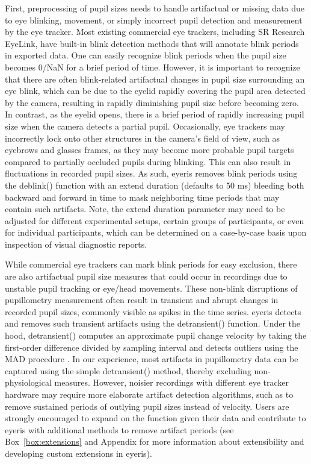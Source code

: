 First, preprocessing of pupil sizes needs to handle artifactual or missing data due to eye blinking, movement, or simply incorrect pupil detection and measurement by the eye tracker. Most existing commercial eye trackers, including SR Research EyeLink, have built-in blink detection methods that will annotate blink periods in exported data. One can easily recognize blink periods when the pupil size becomes 0/NaN for a brief period of time. However, it is important to recognize that there are often blink-related artifactual changes in pupil size surrounding an eye blink, which can be due to the eyelid rapidly covering the pupil area detected by the camera, resulting in rapidly diminishing pupil size before becoming zero. In contrast, as the eyelid opens, there is a brief period of rapidly increasing pupil size when the camera detects a partial pupil. Occasionally, eye trackers may incorrectly lock onto other structures in the camera’s field of view, such as eyebrows and glasses frames, as they may become more probable pupil targets compared to partially occluded pupils during blinking. This can also result in fluctuations in recorded pupil sizes. As such, eyeris removes blink periods using the deblink() function with an extend duration (defaults to 50 ms) bleeding both backward and forward in time to mask neighboring time periods that may contain such artifacts. Note, the extend duration parameter may need to be adjusted for different experimental setups, certain groups of participants, or even for individual participants, which can be determined on a case-by-case basis upon inspection of visual diagnostic reports.

While commercial eye trackers can mark blink periods for easy exclusion, there are also artifactual pupil size measures that could occur in recordings due to unstable pupil tracking or eye/head movements. These non-blink disruptions of pupillometry measurement often result in transient and abrupt changes in recorded pupil sizes, commonly visible as spikes in the time series. eyeris detects and removes such transient artifacts using the detransient() function. Under the hood, detransient() computes an approximate pupil change velocity by taking the first-order difference divided by sampling interval and detects outliers using the MAD procedure \parencite{arachchige2024confidence,hampel1968contributions,hampel1974influence,leys2013detecting,rousseeuw1993alternatives,rousseeuw1986robust}. In our experience, most artifacts in pupillometry data can be captured using the simple detransient() method, thereby excluding non-physiological measures. However, noisier recordings with different eye tracker hardware may require more elaborate artifact detection algorithms, such as to remove sustained periods of outlying pupil sizes instead of velocity. Users are strongly encouraged to expand on the function given their data and contribute to eyeris with additional methods to remove artifact periods (see Box~\ref{box:extensions} and Appendix for more information about extensibility and developing custom extensions in eyeris).


